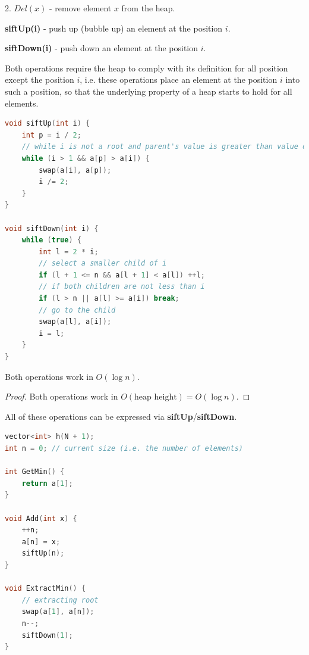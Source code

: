 2. $Del(x)$ - remove element $x$ from the heap.


\textbf{siftUp(i)} - push up (bubble up) an element at the position $i$.

\textbf{siftDown(i)} - push down an element at the position $i$.

Both operations require the heap to comply with its definition for all position except the position $i$, i.e. these operations place an element at the position $i$ into such a position, so that the underlying property of a heap starts to hold for all elements.

\begin{lstlisting}[language=C++]
void siftUp(int i) {
    int p = i / 2;
    // while i is not a root and parent's value is greater than value of i
    while (i > 1 && a[p] > a[i]) {
        swap(a[i], a[p]);
        i /= 2;
    }
}

void siftDown(int i) {
    while (true) {
        int l = 2 * i;
        // select a smaller child of i
        if (l + 1 <= n && a[l + 1] < a[l]) ++l;
        // if both children are not less than i
        if (l > n || a[l] >= a[i]) break;
        // go to the child
        swap(a[l], a[i]);
        i = l;
    }
}
\end{lstlisting}

\begin{lemma}

    Both operations work in $O(\log{n})$.

\end{lemma}

\begin{proof}

    Both operations work in $O(\text{heap height}) = O(\log{n})$.

\end{proof}




All of these operations can be expressed via \textbf{siftUp}/\textbf{siftDown}.

\begin{lstlisting}[language=C++]
vector<int> h(N + 1);
int n = 0; // current size (i.e. the number of elements)

int GetMin() {
    return a[1];
}

void Add(int x) {
    ++n;
    a[n] = x;
    siftUp(n);
}

void ExtractMin() {
    // extracting root
    swap(a[1], a[n]);
    n--;
    siftDown(1);
}
\end{lstlisting}

